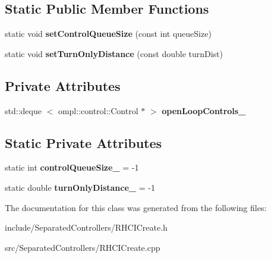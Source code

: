 \subsection*{\-Static \-Public \-Member \-Functions}
\begin{DoxyCompactItemize}
\item 
\hypertarget{class_r_h_c_i_create_a6fa2c185a82c7ec346e9a4a81f5158c3}{static void {\bfseries set\-Control\-Queue\-Size} (const int queue\-Size)}\label{class_r_h_c_i_create_a6fa2c185a82c7ec346e9a4a81f5158c3}

\item 
\hypertarget{class_r_h_c_i_create_a08e9bd17083a978c6b5cd142bca84460}{static void {\bfseries set\-Turn\-Only\-Distance} (const double turn\-Dist)}\label{class_r_h_c_i_create_a08e9bd17083a978c6b5cd142bca84460}

\end{DoxyCompactItemize}
\subsection*{\-Private \-Attributes}
\begin{DoxyCompactItemize}
\item 
\hypertarget{class_r_h_c_i_create_aed57f59895dd7562eeefdd70638c8c83}{std\-::deque\*
$<$ ompl\-::control\-::\-Control $\ast$ $>$ {\bfseries open\-Loop\-Controls\-\_\-}}\label{class_r_h_c_i_create_aed57f59895dd7562eeefdd70638c8c83}

\end{DoxyCompactItemize}
\subsection*{\-Static \-Private \-Attributes}
\begin{DoxyCompactItemize}
\item 
\hypertarget{class_r_h_c_i_create_ad97b8d5019fbef4599a7bde102c57ff1}{static int {\bfseries control\-Queue\-Size\-\_\-} = -\/1}\label{class_r_h_c_i_create_ad97b8d5019fbef4599a7bde102c57ff1}

\item 
\hypertarget{class_r_h_c_i_create_a9a891d5fa2fb784d3345c3c8d65be810}{static double {\bfseries turn\-Only\-Distance\-\_\-} = -\/1}\label{class_r_h_c_i_create_a9a891d5fa2fb784d3345c3c8d65be810}

\end{DoxyCompactItemize}


\-The documentation for this class was generated from the following files\-:\begin{DoxyCompactItemize}
\item 
include/\-Separated\-Controllers/\-R\-H\-C\-I\-Create.\-h\item 
src/\-Separated\-Controllers/\-R\-H\-C\-I\-Create.\-cpp\end{DoxyCompactItemize}

